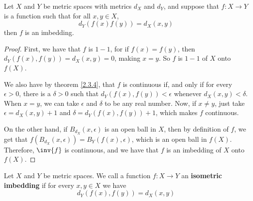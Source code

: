 \begin{lemma}\label{2.3.10}
    Let $X$ and  $Y$ be metric spaces with metrics  $d_X$ and $d_Y$, and suppose
    that  $f:X \rightarrow Y$ is a function such that for all $x,y \in X$,
    \begin{equation*}
        d_Y(f(x)f(y))=d_X(x,y)
    \end{equation*}
    then $f$ is an imbedding.
\end{lemma}
\begin{proof}
    First, we have that $f$ is  $1-1$, for if  $f(x)=f(y)$, then
    $d_Y(f(x),f(y))=d_X(x,y)=0$, making $x=y$. So  $f$ is  $1-1$ of $X$ onto
    $f(X)$.

    We also have by theorem \ref{2.3.4}, that $f$ is continuous if, and only if
    for every  $\epsilon>0$, there is a  $\delta>0$ such that
    $d_Y(f(x),f(y))<\epsilon$ whenever $d_X(x,y)<\delta$. When $x=y$, we can
    take  $\epsilon$ and  $\delta$ to be any real number. Now, if  $x \neq y$,
    just take  $\epsilon=d_X(x,y)+1$ and $\delta=d_Y(f(x),f(y))+1$, which makes
    $f$ continuous.

    On the other hand, if $B_{d_X}(x,\epsilon)$ is an open ball in $X$, then
    by definition of $f$, we get that
    $f(B_{d_X}(x,\epsilon))=B_Y(f(x),\epsilon)$, which is an open ball in
    $f(X)$. Therefore, $\inv{f}$ is continuous, and we have that $f$ is an
    imbedding of  $X$ onto  $f(X)$.
\end{proof}

\begin{definition}
    Let $X$ and  $Y$ be metric spaces. We call a function  $f:X \rightarrow Y$
    an \textbf{isometric imbedding} if for every $x,y \in X$ we have
    \begin{equation}
        d_Y(f(x),f(y))=d_X(x,y)
    \end{equation}
\end{definition}
